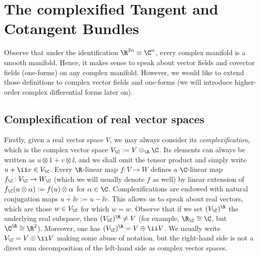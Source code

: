 \section{The complexified Tangent and Cotangent Bundles} \label{section_complexified_bundles}
Observe that under the identification \(\R^{2n} \equiv \C^n\), every complex manifold is a smooth manifold. Hence, it makes sense to speak about vector fields and covector fields (one-forms) on any complex manifold. However, we would like to extend those definitions to complex vector fields and one-forms (we will introduce higher-order complex differential forms later on).

\subsection{Complexification of real vector spaces} \label{section_complexification}
Firstly, given a real vector space \(V\), we may always consider its \textit{complexification}, which is the complex vector space \(V_\C:=V \otimes_\R \C\). Its elements can always be written as \(u\otimes 1+ v \otimes \ii\), and we shall omit the tensor product and simply write \(u+ \ii v \in V_\C\). Every \(\R\)-linear map \(f\colon V \to W\) defines a \(\C\)-linear map \(f_\C\colon V_\C \to W_\C\) (which we will usually denote \(f\) as well) by linear extension of \(f_\C(u \otimes \alpha):=f(u) \otimes \alpha\) for \(\alpha \in \C\). Complexifications are endowed with natural conjugation maps \(\overline{u+ \ii v}:=u-\ii v\). This allows us to speak about real vectors, which are those \(w \in V_\C\) for which \(\overline{w}=w\). Observe that if we set \((V_\C)^\R\) the underlying real subspace, then \((V_\C)^\R\neq V\) (for example, \(\R_\C\cong \C\), but \(\C^\R\cong \R^2\)). Moreover, one has \((V_\C)^\R=V\oplus \ii V\). We usually write \(V_\C=V \oplus \ii V\) making some abuse of notation, but the right-hand side is not a direct sum decomposition of the left-hand side as complex vector spaces.

